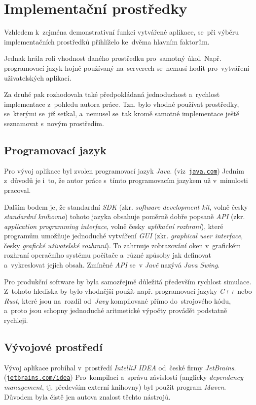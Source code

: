 \section{Implementační prostředky}

Vzhledem k~zejména demonstrativní funkci vytvářené aplikace, se~při výběru implementačních prostředků přihlíželo ke~dvěma hlavním faktorům.

Jednak hrála roli vhodnost daného prostředku pro~samotný úkol. Např. programovací jazyk hojně používaný na~serverech se~nemusí hodit pro~vytváření uživatelských aplikací.

Za druhé pak rozhodovala také předpokládaná jednoduchost a~rychlost implementace z~pohledu autora práce. Tzn. bylo vhodné používat prostředky, se~kterými se~již setkal, a~nemusel se~tak kromě samotné implementace ještě seznamovat s~novým prostředím.

\subsection{Programovací jazyk}

\begin{sloppypar}
Pro vývoj aplikace byl zvolen programovací jazyk \emph{Java}. (viz~\texttt{\href{https://www.java.com/}{java.com}}) Jedním z~důvodů je i~to, že autor práce s~tímto programovacím jazykem už v~minulosti pracoval.
\end{sloppypar}

Dalším bodem je, že standardní \emph{SDK} (zkr. \emph{software development kit}, volně česky \emph{standardní knihovna}) tohoto jazyka obsahuje poměrně dobře popsaně \emph{API} (zkr. \emph{application programming interface}, volně česky \emph{aplikační rozhraní}), které programům umožňuje jednoduché vytváření \emph{GUI} (zkr. \emph{graphical user interface}, česky \emph{grafické uživatelské rozhraní}). To zahrnuje zobrazování oken v~grafickém rozhraní operačního systému počítače a~rů\-zné způsoby jak definovat a~vykreslovat jejich obsah. Zmíněné \emph{API} se~v \emph{Javě} nazývá \emph{Java Swing}.

Pro produkční software by byla samozřejmě důležitá především rychlost simulace. Z~tohoto hlediska by bylo vhodnější použít např. programovací jazyky \emph{C++} nebo \emph{Rust}, které jsou na~rozdíl od~\emph{Javy} kompilované přímo do~strojového kódu, a~proto jsou schopny jednoduché aritmetické výpočty provádět podstatně rychleji.

\subsection{Vývojové prostředí}

\begin{sloppypar}
Vývoj aplikace probíhal v~prostředí \emph{IntelliJ IDEA} od~české firmy \emph{JetBrains}. (\texttt{\href{https://www.jetbrains.com/idea/}{jetbrains.com/idea}}) Pro~kompilaci a~správu závislostí (anglicky \emph{dependency management}, tj. především externí knihovny) byl použit program \emph{Maven}. Důvodem byla čistě jen autova znalost těchto nástrojů. 
\end{sloppypar}
